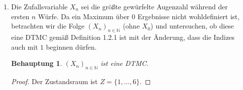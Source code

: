 \documentclass[a4paper]{scrartcl}
\newtheorem*{behaupt}{Behauptung}
\newcommand{\N}{\mathbb{N}}
\newcommand{\prob}{\mathbb{P}}
\begin{document}
\begin{enumerate}[label=\bfseries 1.\arabic*]
\begin{enumerate}[label=\alph*)]
\begin{proof}
                    Da bei $0$ Würfen noch keine Sechs gefallen sein kann, gilt
                    $\prob(X_0 = 0) = 1$ als Anfangswahrscheinlichkeit.

                    Da die Wahrscheinlichkeit, dass ein Zustand im nächsten
                    Schritt angenommen wird, nur von dem aktuellem Zustand
                    abhängt, ist $(X_n)_{n \in \N_0}$ eine Markov-Kette.
                \end{proof}

            \item
                Die Zufallsvariable $X_n$ sei die größte gewürfelte Augenzahl
                während der ersten $n$ Würfe.
                Da ein Maximum über $0$ Ergebnisse nicht wohldefiniert ist,
                betrachten wir die Folge $(X_n)_{n \in \N}$ (ohne $X_0$) und
                untersuchen, ob diese eine DTMC gemäß Definition 1.2.1 ist mit
                der Änderung, dass die Indizes auch mit $1$ beginnen dürfen.

                \begin{behaupt}
                    $(X_n)_{n \in \N}$ ist eine DTMC.
                \end{behaupt}
                \begin{proof}
                    Der Zustandsraum ist $Z = \{1, \dotsc, 6\}$.


\end{proof}
\end{enumerate}
\end{enumerate}
\end{document}
